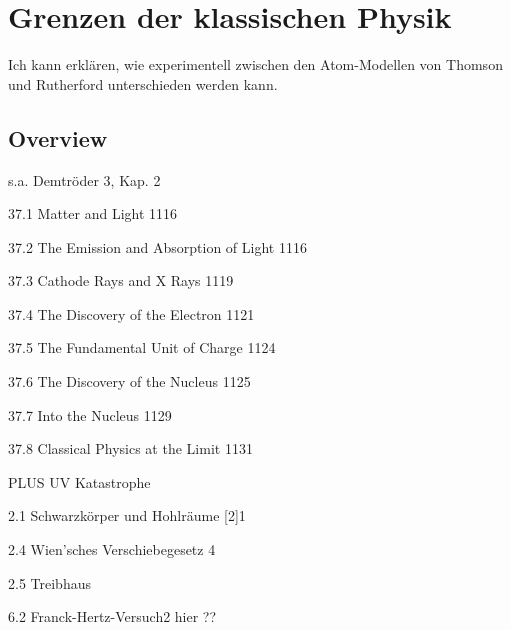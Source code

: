 \renewcommand{\lastmod}{10. September 2024}
\renewcommand{\chapterauthors}{Markus Lippitz}

\chapter{Grenzen der klassischen Physik}





Ich kann erklären, wie experimentell zwischen den Atom-Modellen von Thomson und Rutherford unterschieden werden kann.

\section{Overview}

s.a. Demtröder 3, Kap. 2


37.1 Matter and Light 1116

37.2 The Emission and Absorption of Light 1116

37.3 Cathode Rays and X Rays 1119

37.4 The Discovery of the Electron 1121

37.5 The Fundamental Unit of Charge 1124

37.6 The Discovery of the Nucleus 1125

37.7 Into the Nucleus 1129

37.8 Classical Physics at the Limit 1131


PLUS UV Katastrophe

2.1 Schwarzkörper und Hohlräume [2]1	



2.4 Wien’sches Verschiebegesetz 4	

2.5 Treibhaus

6.2 Franck-Hertz-Versuch2	hier ??





\printbibliography[segment=\therefsegment,heading=subbibliography]
